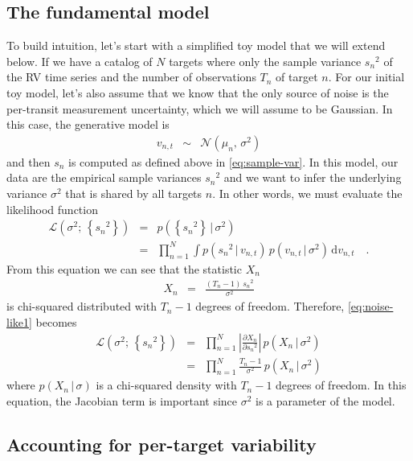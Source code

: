\documentclass[modern, letterpaper]{aastex63}
\newcommand{\dd}{\ensuremath{\,\mathrm{d}}}
\begin{document}
\subsection{The fundamental model}

To build intuition, let's start with a simplified toy model that we will extend below.
If we have a catalog of $N$ targets where only the sample variance ${s_n}^2$ of the RV time series and the number of observations $T_n$ of target $n$.
For our initial toy model, let's also assume that we know that the only source of noise is the per-transit measurement uncertainty, which we will assume to be Gaussian.
In this case, the generative model is
\begin{eqnarray}
	v_{n,t} &\sim& \mathcal{N}(\mu_n,\,\sigma^2)
\end{eqnarray}
and then $s_n$ is computed as defined above in \autoref{eq:sample-var}.
In this model, our data are the empirical sample variances ${s_n}^2$ and we want to infer the underlying variance $\sigma^2$ that is shared by all targets $n$.
In other words, we must evaluate the likelihood function
\begin{eqnarray}
	\label{eq:noise-like1}
	\mathcal{L}(\sigma^2;\,\left\{{s_n}^2\right\}) &=& p(\left\{{s_n}^2\right\}\,|\,\sigma^2) \\
	&=& \prod_{n=1}^N\int p({s_n}^2\,|\,v_{n,t})\,p(v_{n,t}\,|\,\sigma^2) \dd v_{n,t}\quad.
\end{eqnarray}
From this equation we can see that the statistic $X_n$
\begin{eqnarray}
	X_n &=& \frac{(T_n - 1)\,{s_n}^2}{\sigma^2}
\end{eqnarray}
is chi-squared distributed with $T_n - 1$ degrees of freedom.
Therefore, \autoref{eq:noise-like1} becomes
\begin{eqnarray}
	\label{eq:noise-like2}
	\mathcal{L}(\sigma^2;\,\left\{{s_n}^2\right\}) &=& \prod_{n=1}^N \left|\frac{\partial X_n}{\partial {s_n}^2}\right|\,p(X_n\,|\,\sigma^2) \nonumber\\
	&=& \prod_{n=1}^N \frac{T_n - 1}{\sigma^2}\,p(X_n\,|\,\sigma^2)
\end{eqnarray}
where $p(X_n\,|\,\sigma)$ is a chi-squared density with $T_n - 1$ degrees of freedom.
In this equation, the Jacobian term is important since $\sigma^2$ is a parameter of the model.

\subsection{Accounting for per-target variability}
\end{document}
